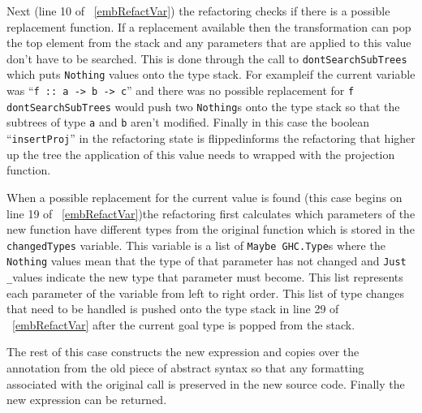 Next (line 10 of \DIFdelbegin {}\DIFdelend \DIFaddbegin {}\DIFaddend ~\ref{embRefactVar}) the refactoring checks if there is a possible replacement function. If a replacement \DIFdelbegin {}\DIFdelend \DIFaddbegin {}\DIFaddend available then the transformation can pop the top element from the stack and any parameters that are applied to this value don't have to be searched. This is done through the call to \texttt{dontSearchSubTrees} which puts \texttt{Nothing} values onto the type stack. For example\DIFaddbegin \DIFadd{, }\DIFaddend if the current variable was ``\texttt{f :: a -> b -> c}'' and there was no possible replacement for \texttt{f}\DIFdelbegin {}\DIFdelend \DIFaddbegin {}\\ \DIFaddend \texttt{dontSearchSubTrees} would push two \texttt{Nothing}s onto the type stack so that the subtrees of type \texttt{a} and \texttt{b} aren't modified. Finally in this case the boolean ``\texttt{insertProj}'' in the refactoring state is flipped\DIFdelbegin {}\DIFdelend \DIFaddbegin {}\DIFaddend informs the refactoring that higher up the tree the application of this value needs to \DIFaddbegin {}\DIFaddend wrapped with the projection function. 

When a possible replacement for the current value is found (this case begins on line 19 of \DIFdelbegin {}\DIFdelend \DIFaddbegin {}\DIFaddend ~\ref{embRefactVar})\DIFaddbegin \DIFadd{, }\DIFaddend the refactoring first calculates which parameters of the new function have different types from the original function which is stored in the \texttt{changedTypes} variable. This variable is a list of \texttt{Maybe GHC.Type}s where the \texttt{Nothing} values mean that the type of that parameter has not changed and \DIFaddbegin {}\DIFaddend \texttt{Just \_}\DIFaddbegin {}\DIFaddend values indicate the new type that \DIFdelbegin {}\DIFdelend \DIFaddbegin {}\DIFaddend parameter must become. This list represents each parameter of the variable from left to right order. This list of type changes that need to be handled is pushed onto the type stack in line 29 of \DIFdelbegin {}\DIFdelend \DIFaddbegin {}\DIFaddend ~\ref{embRefactVar} after the current goal type is popped from the stack. 

The rest of this case constructs the new expression and copies over the annotation from the old piece of abstract syntax so that any formatting associated with the original call is preserved in the new source code. Finally the new expression can be returned.

